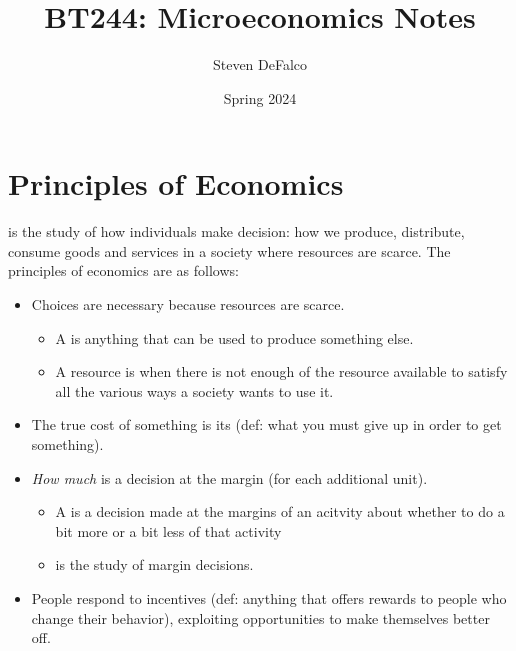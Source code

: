 \documentclass{article}
\title{BT244: Microeconomics Notes}
\author{Steven DeFalco}
\date{Spring 2024}
\begin{document}
\maketitle
\tableofcontents
\newpage


\section{Principles of Economics}

 is the study of how individuals make decision: how we produce, distribute, consume goods and services in a society where resources are scarce. The principles of economics are as follows: 
\begin{itemize}
  \item Choices are necessary because resources are scarce. 
    \begin{itemize}
      \item A  is anything that can be used to produce something else. 
      \item A resource is  when there is not enough of the resource available to satisfy all the various ways a society wants to use it. 
    \end{itemize}
  \item The true cost of something is its  (def: what you must give up in order to get something). 
  \item \emph{How much} is a decision at the margin (for each additional unit). 
    \begin{itemize}
      \item A  is a decision made at the margins of an acitvity about whether to do a bit more or a bit less of that activity 
      \item {} is the study of margin decisions.
    \end{itemize}
  \item People respond to incentives (def: anything that offers rewards to people who change their behavior), exploiting opportunities to make themselves better off. 
\end{itemize}
\end{document}
